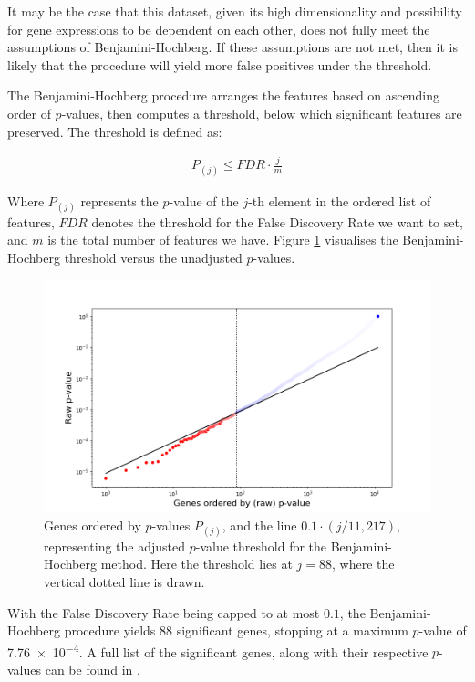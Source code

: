 \documentclass[twocolumn]{article}
\begin{document}
It may be the case that this dataset, given its high dimensionality and possibility for gene expressions to be dependent on each other, does not fully meet the assumptions of Benjamini-Hochberg. If these assumptions are not met, then it is likely that the procedure will yield more false positives under the threshold.

The Benjamini-Hochberg procedure arranges the features based on ascending order of $p$-values, then computes a threshold, below which significant features are preserved. The threshold is defined as:

\begin{align*}
    P_{(j)} \leq FDR\cdot\frac{j}{m}
\end{align*}

Where $P_{(j)}$ represents the $p$-value of the $j$-th element in the ordered list of features, $FDR$ denotes the threshold for the False Discovery Rate we want to set, and $m$ is the total number of features we have. Figure \ref{fig:bh-threshold} visualises the Benjamini-Hochberg threshold versus the unadjusted $p$-values.

\begin{figure}[H]
    \centering
    \includegraphics[width=\linewidth]{figures/SVA_Significant_Genes.png}
    \caption{Genes ordered by $p$-values $P_{(j)}$, and the line $0.1\cdot(j/11,217)$, representing the adjusted $p$-value threshold for the Benjamini-Hochberg method. Here the threshold lies at $j=88$, where the vertical dotted line is drawn.}
    \label{fig:bh-threshold}
\end{figure}

With the False Discovery Rate being capped to at most $0.1$, the Benjamini-Hochberg procedure yields $88$ significant genes, stopping at a maximum $p$-value of \num{7.76e-4}. A full list of the significant genes, along with their respective $p$-values can be found in .
\end{document}
